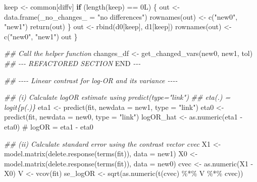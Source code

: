 \documentclass[
  letterpaper,
]{scrbook}
\newenvironment{Shaded}{\begin{snugshade}}{\end{snugshade}}
\newcommand{\AttributeTok}[1]{\textcolor[rgb]{0.40,0.45,0.13}{#1}}
\newcommand{\CommentTok}[1]{\textcolor[rgb]{0.37,0.37,0.37}{#1}}
\newcommand{\ControlFlowTok}[1]{\textcolor[rgb]{0.00,0.23,0.31}{\textbf{#1}}}
\newcommand{\DecValTok}[1]{\textcolor[rgb]{0.68,0.00,0.00}{#1}}
\newcommand{\DocumentationTok}[1]{\textcolor[rgb]{0.37,0.37,0.37}{\textit{#1}}}
\newcommand{\FunctionTok}[1]{\textcolor[rgb]{0.28,0.35,0.67}{#1}}
\newcommand{\NormalTok}[1]{\textcolor[rgb]{0.00,0.23,0.31}{#1}}
\newcommand{\OtherTok}[1]{\textcolor[rgb]{0.00,0.23,0.31}{#1}}
\newcommand{\RegionMarkerTok}[1]{\textcolor[rgb]{0.00,0.23,0.31}{#1}}
\newcommand{\SpecialCharTok}[1]{\textcolor[rgb]{0.37,0.37,0.37}{#1}}
\newcommand{\StringTok}[1]{\textcolor[rgb]{0.13,0.47,0.30}{#1}}
\begin{document}
\begin{Shaded}
\begin{Highlighting}[]
\NormalTok{    keep }\OtherTok{\textless{}{-}}\NormalTok{ common[diffv]}
    \ControlFlowTok{if}\NormalTok{ (}\FunctionTok{length}\NormalTok{(keep) }\SpecialCharTok{==} \DecValTok{0}\NormalTok{L) \{}
\NormalTok{      out }\OtherTok{\textless{}{-}} \FunctionTok{data.frame}\NormalTok{(}\StringTok{\textasciigrave{}}\AttributeTok{\_no\_changes\_}\StringTok{\textasciigrave{}} \OtherTok{=} \StringTok{"no differences"}\NormalTok{)}
      \FunctionTok{rownames}\NormalTok{(out) }\OtherTok{\textless{}{-}} \FunctionTok{c}\NormalTok{(}\StringTok{"new0"}\NormalTok{, }\StringTok{"new1"}\NormalTok{)}
      \FunctionTok{return}\NormalTok{(out)}
\NormalTok{    \}}
\NormalTok{    out }\OtherTok{\textless{}{-}} \FunctionTok{rbind}\NormalTok{(d0[keep], d1[keep])}
    \FunctionTok{rownames}\NormalTok{(out) }\OtherTok{\textless{}{-}} \FunctionTok{c}\NormalTok{(}\StringTok{"new0"}\NormalTok{, }\StringTok{"new1"}\NormalTok{)}
\NormalTok{    out}
\NormalTok{  \}}
  
  \DocumentationTok{\#\# Call the helper function}
\NormalTok{  changes\_df }\OtherTok{\textless{}{-}} \FunctionTok{get\_changed\_vars}\NormalTok{(new0, new1, tol)}
  \DocumentationTok{\#\# {-}{-}{-} REFACTORED SECTION }\RegionMarkerTok{END}\DocumentationTok{ {-}{-}{-}}


  \DocumentationTok{\#\# {-}{-}{-}{-} Linear contrast for log{-}OR and its variance {-}{-}{-}{-}}
  
  \DocumentationTok{\#\# (i) Calculate logOR estimate using predict(type="link")}
  \DocumentationTok{\#\# eta(.) = logit\{p(.)\}}
\NormalTok{  eta1 }\OtherTok{\textless{}{-}} \FunctionTok{predict}\NormalTok{(fit, }\AttributeTok{newdata =}\NormalTok{ new1, }\AttributeTok{type =} \StringTok{"link"}\NormalTok{)}
\NormalTok{  eta0 }\OtherTok{\textless{}{-}} \FunctionTok{predict}\NormalTok{(fit, }\AttributeTok{newdata =}\NormalTok{ new0, }\AttributeTok{type =} \StringTok{"link"}\NormalTok{)}
\NormalTok{  logOR\_hat }\OtherTok{\textless{}{-}} \FunctionTok{as.numeric}\NormalTok{(eta1 }\SpecialCharTok{{-}}\NormalTok{ eta0) }\CommentTok{\# logOR = eta1 {-} eta0}
  
  \DocumentationTok{\#\# (ii) Calculate standard error using the contrast vector \textquotesingle{}cvec\textquotesingle{}}
\NormalTok{  X1 }\OtherTok{\textless{}{-}} \FunctionTok{model.matrix}\NormalTok{(}\FunctionTok{delete.response}\NormalTok{(}\FunctionTok{terms}\NormalTok{(fit)), }\AttributeTok{data =}\NormalTok{ new1)}
\NormalTok{  X0 }\OtherTok{\textless{}{-}} \FunctionTok{model.matrix}\NormalTok{(}\FunctionTok{delete.response}\NormalTok{(}\FunctionTok{terms}\NormalTok{(fit)), }\AttributeTok{data =}\NormalTok{ new0)}
\NormalTok{  cvec      }\OtherTok{\textless{}{-}} \FunctionTok{as.numeric}\NormalTok{(X1 }\SpecialCharTok{{-}}\NormalTok{ X0)}
\NormalTok{  V         }\OtherTok{\textless{}{-}} \FunctionTok{vcov}\NormalTok{(fit)}
\NormalTok{  se\_logOR  }\OtherTok{\textless{}{-}} \FunctionTok{sqrt}\NormalTok{(}\FunctionTok{as.numeric}\NormalTok{(}\FunctionTok{t}\NormalTok{(cvec) }\SpecialCharTok{\%*\%}\NormalTok{ V }\SpecialCharTok{\%*\%}\NormalTok{ cvec))}


\end{Highlighting}
\end{Shaded}
\end{document}
